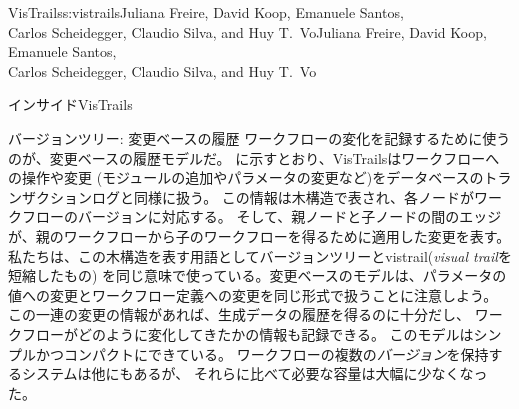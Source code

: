\begin{aosachaptertoc}{VisTrails}{s:vistrails}{Juliana Freire, David Koop, Emanuele Santos, \\ Carlos Scheidegger, Claudio Silva, and Huy T.\ Vo}{Juliana Freire, David Koop, Emanuele Santos, \\ \hspace*{0.9cm} Carlos Scheidegger, Claudio Silva, and Huy T.\ Vo}
\begin{aosasect1}{インサイドVisTrails}
\begin{aosasect2}{バージョンツリー: 変更ベースの履歴}
ワークフローの変化を記録するために使うのが、変更ベースの履歴モデルだ。
に示すとおり、VisTrailsはワークフローへの操作や変更
(モジュールの追加やパラメータの変更など)をデータベースのトランザクションログと同様に扱う。
この情報は木構造で表され、各ノードがワークフローのバージョンに対応する。
そして、親ノードと子ノードの間のエッジが、親のワークフローから子のワークフローを得るために適用した変更を表す。
私たちは、この木構造を表す用語としてバージョンツリーとvistrail(\emph{visual trail}を短縮したもの)
を同じ意味で使っている。変更ベースのモデルは、パラメータの値への変更とワークフロー定義への変更を同じ形式で扱うことに注意しよう。
この一連の変更の情報があれば、生成データの履歴を得るのに十分だし、
ワークフローがどのように変化してきたかの情報も記録できる。
このモデルはシンプルかつコンパクトにできている。
ワークフローの複数の\emph{バージョン}を保持するシステムは他にもあるが、
それらに比べて必要な容量は大幅に少なくなった。


\end{aosasect2}
\end{aosasect1}
\end{aosachaptertoc}
